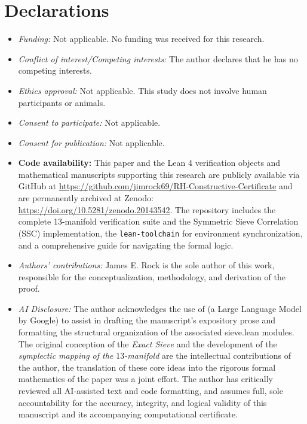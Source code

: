 \documentclass[sn-mathphys-num, pdflatex]{sn-jnl}
\begin{document}
\section*{Declarations}

\begin{itemize}
\item \textit{Funding:} Not applicable. No funding was received for this research.
\item \textit{Conflict of interest/Competing interests:} The author declares that he has no competing interests.
\item \textit{Ethics approval:} Not applicable. This study does not involve human participants or animals.
\item \textit{Consent to participate:} Not applicable.
\item \textit{Consent for publication:} Not applicable.
\item \textbf{Code availability:} This paper and
the Lean 4 verification objects and mathematical manuscripts supporting 
this research are publicly available via GitHub at 
\url{https://github.com/jimrock69/RH-Constructive-Certificate} 
and are permanently archived at Zenodo: 
\href{https://doi.org/10.5281/zenodo.20143542}{https://doi.org/10.5281/zenodo.20143542}. The repository includes the complete 13-manifold verification suite and the Symmetric Sieve Correlation (SSC) implementation, the \texttt{lean-toolchain} for environment synchronization, and a comprehensive guide for navigating the formal logic. 
\item \textit{Authors' contributions:} James E. Rock is the sole author of this work, responsible for the conceptualization, methodology, and derivation of the proof.
\item \textit{AI Disclosure:} The author acknowledges the use of \cite{gemini} (a Large Language Model by Google) to assist in drafting the manuscript's expository prose and formatting the structural organization of the associated sieve.lean modules. The original conception of the \textit{Exact Sieve} and the development of the \textit{symplectic mapping of the $13$-manifold} are the intellectual contributions of the author, the translation of these core ideas into the rigorous formal mathematics of the paper was a joint effort. The author has critically reviewed all AI-assisted text and code formatting, and assumes full, sole accountability for the accuracy, integrity, and logical validity of this manuscript and its accompanying computational certificate.
\end{itemize}
 
\end{document}

